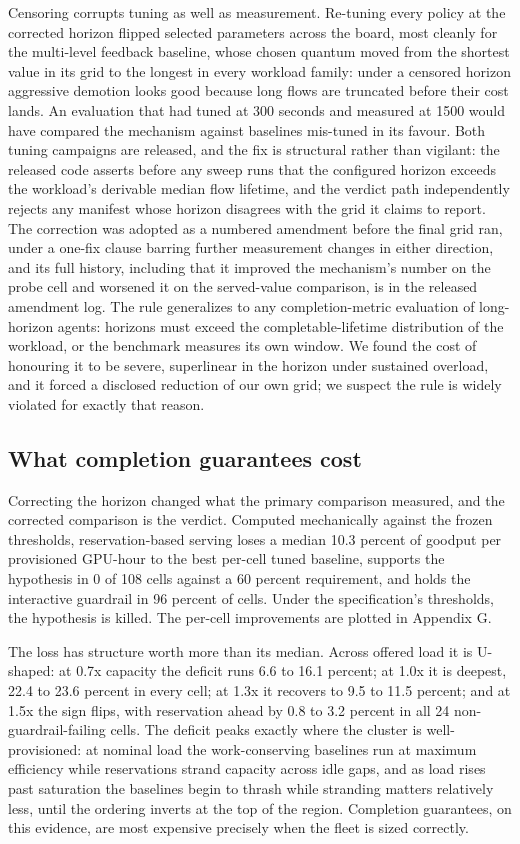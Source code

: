 Censoring corrupts tuning as well as measurement. Re-tuning every policy at the corrected horizon flipped selected parameters across the board, most cleanly for the multi-level feedback baseline, whose chosen quantum moved from the shortest value in its grid to the longest in every workload family: under a censored horizon aggressive demotion looks good because long flows are truncated before their cost lands. An evaluation that had tuned at 300 seconds and measured at 1500 would have compared the mechanism against baselines mis-tuned in its favour. Both tuning campaigns are released, and the fix is structural rather than vigilant: the released code asserts before any sweep runs that the configured horizon exceeds the workload's derivable median flow lifetime, and the verdict path independently rejects any manifest whose horizon disagrees with the grid it claims to report. The correction was adopted as a numbered amendment before the final grid ran, under a one-fix clause barring further measurement changes in either direction, and its full history, including that it improved the mechanism's number on the probe cell and worsened it on the served-value comparison, is in the released amendment log. The rule generalizes to any completion-metric evaluation of long-horizon agents: horizons must exceed the completable-lifetime distribution of the workload, or the benchmark measures its own window. We found the cost of honouring it to be severe, superlinear in the horizon under sustained overload, and it forced a disclosed reduction of our own grid; we suspect the rule is widely violated for exactly that reason.

\subsection{What completion guarantees cost}

Correcting the horizon changed what the primary comparison measured, and
the corrected comparison is the verdict. Computed mechanically against
the frozen thresholds, reservation-based serving loses a median 10.3
percent of goodput per provisioned GPU-hour to the best per-cell tuned
baseline, supports the hypothesis in 0 of 108 cells against a 60 percent
requirement, and holds the interactive guardrail in 96 percent of cells.
Under the specification's thresholds, the hypothesis is killed. The
per-cell improvements are plotted in Appendix G.

The loss has structure worth more than its median. Across offered load
it is U-shaped: at 0.7x capacity the deficit runs 6.6 to 16.1 percent;
at 1.0x it is deepest, 22.4 to 23.6 percent in every cell; at 1.3x it
recovers to 9.5 to 11.5 percent; and at 1.5x the sign flips, with
reservation ahead by 0.8 to 3.2 percent in all 24 non-guardrail-failing
cells. The deficit peaks exactly where the cluster is well-provisioned:
at nominal load the work-conserving baselines run at maximum efficiency
while reservations strand capacity across idle gaps, and as load rises
past saturation the baselines begin to thrash while stranding matters
relatively less, until the ordering inverts at the top of the region.
Completion guarantees, on this evidence, are most expensive precisely
when the fleet is sized correctly.

